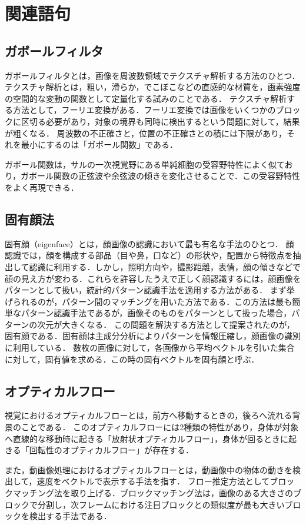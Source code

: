 \chapter{関連語句}
\section{ガボールフィルタ}
ガボールフィルタとは，画像を周波数領域でテクスチャ解析する方法のひとつ．
テクスチャ解析とは，粗い，滑らか，でこぼこなどの直感的な材質を，画素強度の空間的な変動の関数として定量化する試みのことである\cite{テクスチャ解析}．
テクスチャ解析する方法として，フーリエ変換がある．フーリエ変換では画像をいくつかのブロックに区切る必要があり，対象の境界も同時に検出するという問題に対して，結果が粗くなる．
周波数の不正確さと，位置の不正確さとの積には下限があり，それを最小にするのは「ガボール関数」である．\par
ガボール関数は，サルの一次視覚野にある単純細胞の受容野特性によく似ており，ガボール関数の正弦波や余弦波の傾きを変化させることで．この受容野特性をよく再現できる．
\begin{flushright}
    \cite[p.144]{認知心理学辞典}
\end{flushright}
\section{固有顔法}
固有顔（eigenface）とは，顔画像の認識において最も有名な手法のひとつ．
顔認識では，顔を構成する部品（目や鼻，口など）の形状や，配置から特徴点を抽出して認識に利用する．しかし，照明方向や，撮影距離，表情，顔の傾きなどで顔の見え方が変わる．これらを許容したうえで正しく顔認識するには，顔画像をパターンとして扱い，統計的パターン認識手法を適用する方法がある．
まず挙げられるのが，パターン間のマッチングを用いた方法である．この方法は最も簡単なパターン認識手法であるが，画像そのものをパターンとして扱った場合，パターンの次元が大きくなる．
この問題を解決する方法として提案されたのが，固有顔である．固有顔は主成分分析によりパターンを情報圧縮し，顔画像の識別に利用している．
数枚の画像に対して，各画像から平均ベクトルを引いた集合に対して，固有値を求める．この時の固有ベクトルを固有顔と呼ぶ．\par
\hfill\cite{顔画像からの個人識別}
\section{オプティカルフロー}
視覚におけるオプティカルフローとは，前方へ移動するときの，後ろへ流れる背景のことである．
このオプティカルフローには2種類の特性があり，身体が対象へ直線的な移動時に起きる「放射状オプティカルフロー」，身体が回るときに起きる「回転性のオプティカルフロー」が存在する\cite[p.679]{人間の運動学}．\par
また，動画像処理におけるオプティカルフローとは，動画像中の物体の動きを検出して，速度をべクトルで表示する手法を指す．
フロー推定方法としてブロックマッチング法を取り上げる．ブロックマッチング法は，画像のある大きさのブロックで分割し，次フレームにおける注目ブロックとの類似度が最も大きいブロックを検出する手法である\cite{オプティカルフローを用いた画像中の野鳥検出}．
\newpage
